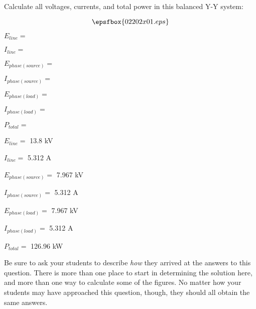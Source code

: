 

Calculate all voltages, currents, and total power in this balanced Y-Y system:

$$\epsfbox{02202x01.eps}$$

\medskip
\item{} $E_{line} =$
\item{} $I_{line} =$
\item{} $E_{phase(source)} =$
\item{} $I_{phase(source)} =$
\item{} $E_{phase(load)} =$
\item{} $I_{phase(load)} =$
\item{} $P_{total} =$
\medskip







\medskip
\item{} $E_{line} =$ 13.8 kV
\item{} $I_{line} =$ 5.312 A
\item{} $E_{phase(source)} =$ 7.967 kV
\item{} $I_{phase(source)} =$ 5.312 A
\item{} $E_{phase(load)} =$ 7.967 kV
\item{} $I_{phase(load)} =$ 5.312 A
\item{} $P_{total} =$ 126.96 kW
\medskip







Be sure to ask your students to describe {\it how} they arrived at the answers to this question.  There is more than one place to start in determining the solution here, and more than one way to calculate some of the figures.  No matter how your students may have approached this question, though, they should all obtain the same answers.





